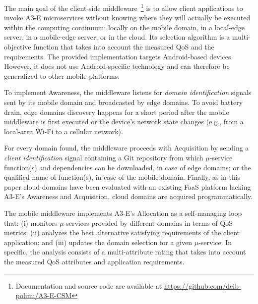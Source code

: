 
The main goal of the client-side middleware~\footnote{Documentation and source code are available at \url{https://github.com/deib-polimi/A3-E-CSM}} is to allow client applications to invoke A3-E microservices without knowing where they will actually be executed within the computing continuum: locally on the mobile domain, in a local-edge server, in a mobile-edge server, or in the cloud. Its selection algorithm is a multi-objective function that takes into account the measured QoS and the requirements. The provided implementation targets Android-based devices. However, it does not use Android-specific technology and can therefore be generalized to other mobile platforms. 

To implement Awareness, the middleware listens for \textit{domain identification} signals sent by its mobile domain and broadcasted by edge domains. To avoid battery drain, edge domains discovery happens for a short period after the mobile middleware is first executed or the device's network state changes (e.g., from a local-area Wi-Fi to a cellular network). 

For every domain found, the middleware proceeds with Acquisition by sending a \textit{client identification} signal containing a Git repository from which $\mu$-service function(s) and dependencies can be downloaded, in case of edge domains; or the qualified name of function(s), in case of the mobile domain. Finally, as in this paper cloud domains have been evaluated with an existing FaaS platform lacking A3-E's Awareness and Acquisition, cloud domains are acquired programmatically.



The mobile middleware implements A3-E's Allocation as a self-managing loop that: (i) monitors $\mu$-services provided by different domains in terms of QoS metrics; (ii) analyzes the best alternative satisfying requirements of the client application; and (iii) updates the domain selection for a given $\mu$-service. In specific, the analysis consists of a multi-attribute rating that takes into account the measured QoS attributes and application requirements.

